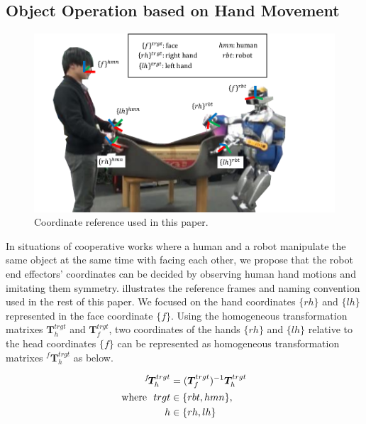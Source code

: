 \subsection{Object Operation based on Hand Movement}
\label{subsec:move_hand}

\begin{figure}[htbp]
 \begin{center}
  \includegraphics[width=1.00\columnwidth]{figs/coords_reference3}
  \caption{Coordinate reference used in this paper.}
  \label{figure:coords}
 \end{center}
\end{figure}

In situations of cooperative works where a human and a robot manipulate the same object at the same time with facing each other, we propose that the robot end effectors' coordinates can be decided by observing human hand motions and imitating them symmetry.  illustrates the reference frames and naming convention used in the rest of this paper. We focused on the hand coordinates \(\{rh\}\) and \(\{lh\}\) represented in the face coordinate \(\{f\}\). Using the homogeneous transformation matrixes \(\bm{T}^{trgt}_{h}\) and \(\bm{T}^{trgt}_{f}\), two coordinates of the hands \(\{rh\}\) and \(\{lh\}\) relative to the head coordinates \(\{f\}\) can be represented as homogeneous transformation matrixes \(^{f}\!\bm{T}^{trgt}_{h}\) as below.

\begin{align}
^{f}\!\bm{T}^{trgt}_{h} &= (\bm{T}^{trgt}_{f})^{-1}\bm{T}^{trgt}_{h}\\
{\rm where} \ \ trgt &\in \{rbt, hmn\},\nonumber \\
h &\in \{rh, lh\} \nonumber
\end{align}

